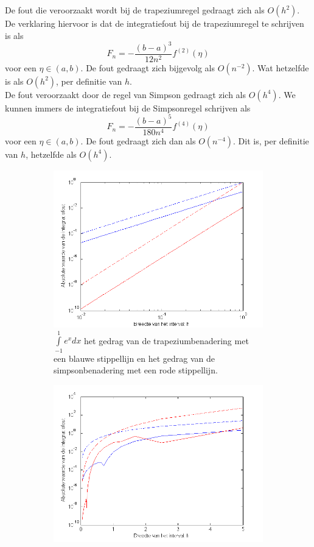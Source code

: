 \documentclass[11pt,a4paper]{article}
\begin{document}
De fout die veroorzaakt wordt bij de trapeziumregel gedraagt zich als $O(h^2)$. De verklaring hiervoor is dat de integratiefout bij de trapeziumregel te schrijven is als \[ F_n = -\dfrac{(b-a)^3}{12n^2}f^{(2)}(\eta) \] voor een $\eta \in (a,b)$. De fout gedraagt zich bijgevolg als $O(n^{-2})$. Wat hetzelfde is als $O(h^2)$, per definitie van $h$.
\\
De fout veroorzaakt door de regel van Simpson gedraagt zich als $O(h^4)$. We kunnen immers de integratiefout bij de Simpsonregel schrijven als \[ F_n = -\dfrac{(b-a)^5}{180n^4}f^{(4)}(\eta) \] voor een $\eta \in (a,b)$. De fout gedraagt zich dan als $O(n^{-4})$. Dit is, per definitie van $h$, hetzelfde als $O(h^4)$.
\vspace{-45pt}
\begin{figure}[H]
	\begin{subfigure}{0.5\textwidth}
	\includegraphics[width=\textwidth]{11b1.png}
	\caption*{$\int\limits_{-1}^1e^xdx$ het gedrag van de trapeziumbenadering met een blauwe stippellijn en het gedrag van de simpsonbenadering met een rode stippellijn.}
	\end{subfigure}
	\begin{subfigure}{0.5\textwidth}
	\includegraphics[width=\textwidth]{11b2.png}

\end{subfigure}
\end{figure}
\end{document}
